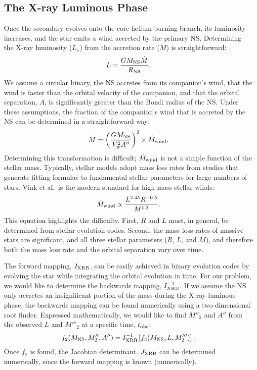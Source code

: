 \documentclass[12pt, preprint]{aastex}
\begin{document}
\subsection{The X-ray Luminous Phase}

Once the secondary evolves onto the core helium burning branch, its luminosity increases, and the star emits a wind accreted by the primary NS. Determining the X-ray luminosity ($L_x$) from the accretion rate ($\dot{M}$) is straightforward: 
\begin{equation}
L = \frac{G M_{\rm NS} \dot{M}}{R_{\rm NS}}.
\end{equation}
We assume a circular binary, the NS accretes from its companion's wind, that the wind is faster than the orbital velocity of the companion, and that the orbital separation, $A$, is significantly greater than the Bondi radius of the NS. Under these assumptions, the fraction of the companion's wind that is accreted by the NS can be determined in a straightforward way:
\begin{equation}
\dot{M} = \left( \frac{G M_{\rm NS}}{V_w^2 A''} \right)^2 \times \dot{M}_{\rm wind}.
\end{equation}
Determining this transformation is difficult; $\dot{M}_{\rm wind}$ is not a simple function of the stellar mass. Typically, stellar models adopt mass loss rates from studies that generate fitting formulae to fundamental stellar parameters for large numbers of stars. Vink et al.\ is the modern standard for high mass stellar winds:
\begin{equation}
\dot{M}_{\rm wind} \propto \frac{L^{2.45} R^{-0.5}}{M^{1.3}}. \label{eq:vink}
\end{equation}
This equation highlights the difficulty. First, $R$ and $L$ must, in general, be determined from stellar evolution codes. Second, the mass loss rates of massive stars are significant, and all three stellar parameters ($R$, $L$, and $M$), and therefore both the mass loss rate and the orbital separation vary over time. 

The forward mapping, $I_{\rm XRB}$, can be easily achieved in binary evolution codes by evolving the star while integrating the orbital evolution in time. For our problem, we would like to determine the backwards mapping, $I^{-1}_{\rm XRB}$. If we assume the NS only accretes an insignificant portion of the mass during the X-ray luminous phase, the backwards mapping can be found numerically using a two-dimensional root finder. Expressed mathematically, we would like to find $M''_2$ and $A''$ from the observed $L$ and $M'''_2$ at a specific time, $t_{\rm obs}$:
\begin{equation}
f_2(M_{\rm NS}, M''_2, A'') = I^{-1}_{\rm XRB} \left[ f_3(M_{\rm NS}, L, M'''_2) \right].
\end{equation}
Once $f_2$ is found, the Jacobian determinant, $J_{\rm XRB}$ can be determined numerically, since the forward mapping is known (numerically).
\end{document}
